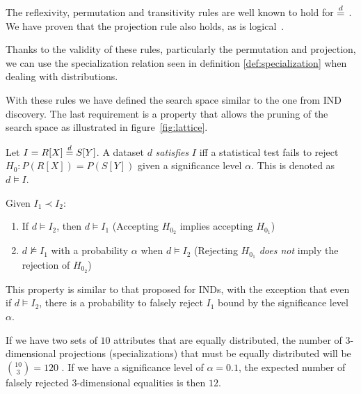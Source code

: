 The reflexivity, permutation and transitivity rules are well known to hold
for $\stackrel{d}{=}$ \cite{randles1979introduction}.
We have proven that the projection rule also holds, as is logical~\cite{Alvarez2021inference}.

Thanks to the validity of these rules, particularly the permutation and projection,
we can use the specialization relation seen in definition \ref{def:specialization}
when dealing with distributions.

With these rules we have defined the search space similar to the one from IND discovery.
The last requirement is a property that allows the pruning of the
search space as illustrated in figure~\ref{fig:lattice}.

Let $I = R[X] \stackrel{d}{=} S[Y]$.
A dataset $d$ \emph{satisfies} $I$ iff  a statistical test fails to reject $H_0: P(R[X]) = P(S[Y])$
given a significance level $\alpha$.
This is denoted as $d \models I$.

\begin{property}
    Given $I_1 \prec I_2$:
    
    \label{prop:prob_spec}
    \begin{enumerate}
        \item If $d \models I_2$, then $d \models I_1$ (Accepting $H_{0_2}$ implies accepting $H_{0_1}$\footnotemark)
        \item $d \not\models I_1$ with a probability $\alpha$ when $d \models I_2$
            (Rejecting $H_{0_1}$ \emph{does not} imply the rejection of $H_{0_2}$)
    \end{enumerate}
\end{property}


This property is similar to that proposed for INDs\cite{DeMarchi2002}, with the exception that even if $d \models I_2$, there is a probability to falsely reject $I_1$ bound by the significance level $\alpha$.


\begin{example}
    If we have two sets of $10$ attributes that are equally distributed, the number of
    3-dimensional projections (specializations) that must be equally distributed will be $\binom{10}{3} = 120$ .
    If we have a significance level of $\alpha = 0.1$, the expected number of
    falsely rejected 3-dimensional equalities is then $12$.
\end{example}

